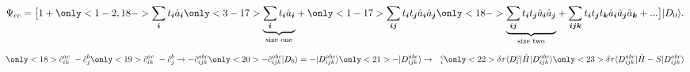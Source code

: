 \documentclass{beamer}
\begin{document}
\begin{frame}
\begin{center}
\begin{tikzpicture}[scale=.7,every node/.style={minimum size=1cm},on grid]
			
			
			\end{tikzpicture}
		\end{center}	
\begin{equation*}
\Psi_{cc} = \big[1 +\only<1-2,18->{\sum_{\boldsymbol{i}} t_{\boldsymbol{i}}\hat{a}_{\boldsymbol{i}}\vphantom{\underbrace{\sum_{\boldsymbol{i}} t_{\boldsymbol{i}}\hat{a}_{\boldsymbol{i}}}_\text{size one}}}\only<3-17>{\underbrace{\sum_{\boldsymbol{i}} t_{\boldsymbol{i}}\hat{a}_{\boldsymbol{i}}}_\text{size one}}+
\only<1-17>{\sum_{\boldsymbol{ij}} t_{\boldsymbol{i}} t_{\boldsymbol{j}} \hat{a}_{\boldsymbol{i}} \hat{a}_{\boldsymbol{j}}}\vphantom{\underbrace{\sum_{\boldsymbol{ij}} t_{\boldsymbol{i}} t_{\boldsymbol{j}} \hat{a}_{\boldsymbol{i}} \hat{a}_{\boldsymbol{j}}}_\text{size two}}
\only<18->{\underbrace{\sum_{\boldsymbol{ij}} t_{\boldsymbol{i}} t_{\boldsymbol{j}} \hat{a}_{\boldsymbol{i}} \hat{a}_{\boldsymbol{j}}}_\text{size two}}
+ \sum_{\boldsymbol{ijk}}t_{\boldsymbol{i}} t_{\boldsymbol{j}} t_{\boldsymbol{k}} \hat{a}_{\boldsymbol{i}} \hat{a}_{\boldsymbol{j}} \hat{a}_{\boldsymbol{k}} + ...  \big]|D_0\rangle.
\end{equation*}
\begin{equation*}
\only<18>{\hat{c}_{ik}^{ac} \ -\hat{c}_j^b}
\only<19>{\hat{c}_{ik}^{ac} \ -\hat{c}_j^b \rightarrow -\hat{c}_{ijk}^{abc}}
\only<20>{-\hat{c}_{ijk}^{abc}|D_0\rangle = -|D_{ijk}^{abc}\rangle}
\only<21>{-|D_{ijk}^{abc}\rangle \rightarrow \ \ ^c_i}
\only<22>{\delta\tau \langle D_i^c |\hat{H}|D_{ijk}^{abc}\rangle }
\only<23>{\delta\tau \langle D_{ijk}^{abc} |\hat{H}-S|D_{ijk}^{abc}\rangle }
\end{equation*}
\end{frame}
\end{document}
